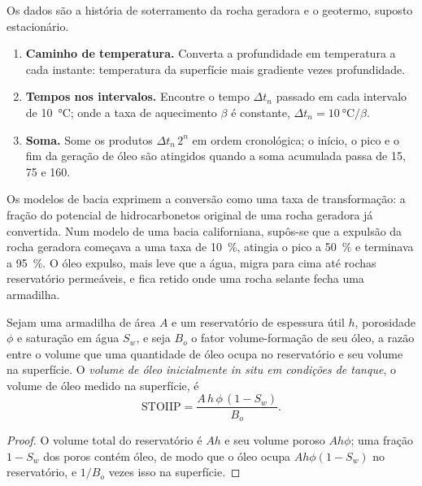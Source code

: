 \begin{method}\label{met:b2:energy-geology:tti}
Os dados são a história de soterramento da rocha geradora e o geotermo, suposto estacionário.
\begin{enumerate}
  \item \textbf{Caminho de temperatura.} Converta a profundidade em temperatura a cada instante: temperatura da superfície
        mais gradiente vezes profundidade.
  \item \textbf{Tempos nos intervalos.} Encontre o tempo $\Delta t_n$ passado em cada intervalo de
        \qty{10}{\celsius}; onde a taxa de aquecimento $\beta$ é constante, $\Delta t_n = \qty{10}{\celsius}/\beta$.
  \item \textbf{Soma.} Some os produtos $\Delta t_n\,2^n$ em ordem cronológica; o início, o pico e o
        fim da geração de óleo são atingidos quando a soma acumulada passa de 15, 75 e 160.
\end{enumerate}
\end{method}

Os modelos de bacia exprimem a conversão como uma taxa de transformação: a fração do potencial
de hidrocarbonetos original de uma rocha geradora já convertida. Num modelo de uma bacia californiana,
supôs-se que a expulsão da rocha geradora começava a uma taxa de \qty{10}{\percent}, atingia o pico a
\qty{50}{\percent} e terminava a \qty{95}{\percent}. O óleo expulso, mais leve que a água,
migra para cima até rochas reservatório permeáveis, e fica retido onde uma rocha selante fecha uma armadilha.

\begin{proposition}\label{prop:b2:energy-geology:volumetrics}
Sejam uma armadilha de área $A$ e um reservatório de espessura útil $h$, porosidade $\phi$ e saturação em água
$S_w$, e seja $B_o$ o fator volume-formação de seu óleo, a razão entre o volume que uma quantidade
de óleo ocupa no reservatório e seu volume na superfície. O \emph{volume de óleo inicialmente in situ
em condições de tanque}, o volume de óleo medido na superfície, é
\begin{equation}
\mathrm{STOIIP} = \frac{A\,h\,\phi\,(1 - S_w)}{B_o} .
\label{eq:b2:energy-geology:stoiip}
\end{equation}
\end{proposition}

\begin{proof}
O volume total do reservatório é $Ah$ e seu volume poroso $Ah\phi$; uma fração $1 - S_w$ dos
poros contém óleo, de modo que o óleo ocupa $Ah\phi(1 - S_w)$ no reservatório, e $1/B_o$ vezes isso
na superfície.
\end{proof}

